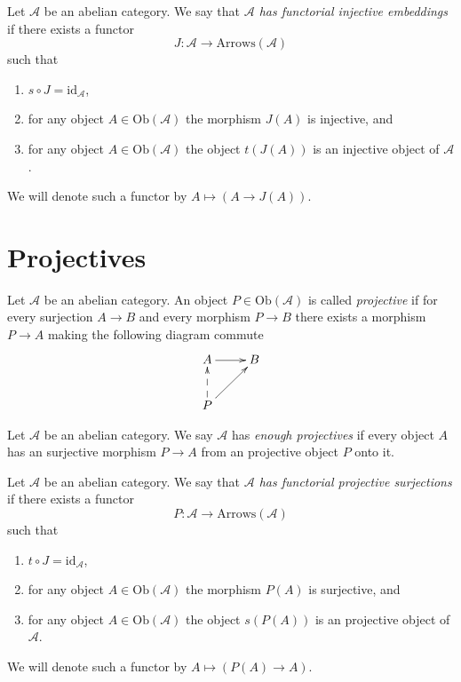 \begin{definition}
\label{definition-functorial-injective-embedding}
Let $\mathcal{A}$ be an abelian category.
We say that {\it $\mathcal{A}$ has functorial injective embeddings}
if there exists a functor
$$
J : \mathcal{A} \longrightarrow \text{Arrows}(\mathcal{A})
$$
such that
\begin{enumerate}
\item $s \circ J = \text{id}_{\mathcal{A}}$,
\item for any object $A \in \text{Ob}(\mathcal{A})$
the morphism $J(A)$ is injective, and
\item for any object $A \in \text{Ob}(\mathcal{A})$
the object $t(J(A))$ is an injective object of $\mathcal{A}$.
\end{enumerate}
We will denote such a functor by
$A \mapsto (A \to J(A))$.
\end{definition}

\section{Projectives}
\label{section-projectives}

\begin{definition}
\label{definition-projective}
Let $\mathcal{A}$ be an abelian category.
An object $P \in \text{Ob}(\mathcal{A})$ is
called {\it projective} if for every surjection
$A \rightarrow B$ and every morphism
$P \to B$ there exists a morphism $P \to A$ making
the following diagram commute
$$
\xymatrix{
A \ar[r] & B \\
P \ar@{-->}[u] \ar[ru] & 
}
$$
\end{definition}

\begin{definition}
\label{definition-enough-projectives}
Let $\mathcal{A}$ be an abelian category.
We say $\mathcal{A}$ has {\it enough projectives}
if every object $A$ has an surjective morphism
$P \to A$ from an projective object $P$ onto it.
\end{definition}

\begin{definition}
\label{definition-functorial-projective-surjections}
Let $\mathcal{A}$ be an abelian category.
We say that {\it $\mathcal{A}$ has functorial projective surjections}
if there exists a functor
$$
P : \mathcal{A} \longrightarrow \text{Arrows}(\mathcal{A})
$$
such that
\begin{enumerate}
\item $t \circ J = \text{id}_{\mathcal{A}}$,
\item for any object $A \in \text{Ob}(\mathcal{A})$
the morphism $P(A)$ is surjective, and
\item for any object $A \in \text{Ob}(\mathcal{A})$
the object $s(P(A))$ is an projective object of $\mathcal{A}$.
\end{enumerate}
We will denote such a functor by
$A \mapsto (P(A) \to A)$.
\end{definition}


